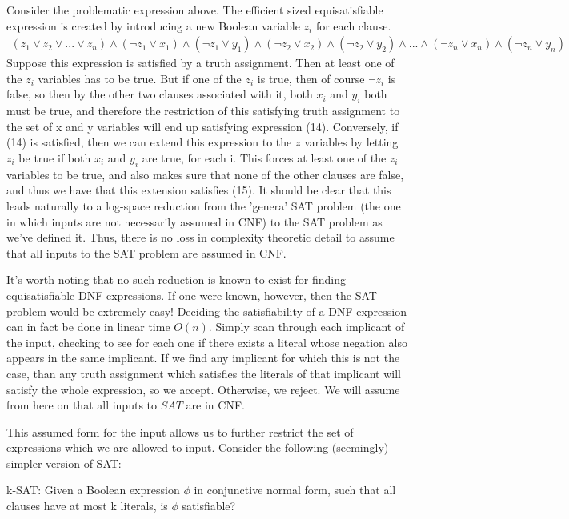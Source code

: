 \par Consider the problematic expression above. The efficient sized equisatisfiable expression is created by introducing a new Boolean variable $z_i$ for each clause.
\begin{align}
    (z_1 \vee z_2 \vee ... \vee z_n) \wedge (\neg z_1 \vee x_1) \wedge (\neg z_1 \vee y_1) \wedge (\neg z_2 \vee x_2) \wedge (\neg z_2 \vee y_2) \wedge ... \wedge (\neg z_n \vee x_n) \wedge (\neg z_n \vee y_n)
\end{align}
Suppose this expression is satisfied by a truth assignment. Then at least one of the $z_i$ variables has to be true. But if one of the $z_i$ is true, then of course $\neg z_i$ is false, so then by the other two clauses associated with it, both $x_i$ and $y_i$ both must be true, and therefore the restriction of this satisfying truth assignment to the set of x and y variables will end up satisfying expression (14). Conversely, if (14) is satisfied, then we can extend this expression to the $z$ variables by letting $z_i$ be true if both $x_i$ and $y_i$ are true, for each i. This forces at least one of the $z_i$ variables to be true, and also makes sure that none of the other clauses are false, and thus we have that this extension satisfies (15). It should be clear that this leads naturally to a log-space reduction from the 'genera' SAT problem (the one in which inputs are not necessarily assumed in CNF) to the SAT problem as we've defined it. Thus, there is no loss in complexity theoretic detail to assume that all inputs to the SAT problem are assumed in CNF. 
\par It's worth noting that no such reduction is known to exist for finding equisatisfiable DNF expressions. If one were known, however, then the SAT problem would be extremely easy! Deciding the satisfiability of a DNF expression can in fact be done in linear time $O(n)$. Simply scan through each implicant of the input, checking to see for each one if there exists a literal whose negation also appears in the same implicant. If we find any implicant for which this is not the case, than any truth assignment which satisfies the literals of that implicant will satisfy the whole expression, so we accept. Otherwise, we reject. We will assume from here on that all inputs to $SAT$ are in CNF.
\par This assumed form for the input allows us to further restrict the set of expressions which we are allowed to input. Consider the following (seemingly) simpler version of SAT:
\begin{problem} 
k-SAT: Given a Boolean expression $\phi$ in conjunctive normal form, such that all clauses have at most k literals, is $\phi$ satisfiable?
\end{problem}
